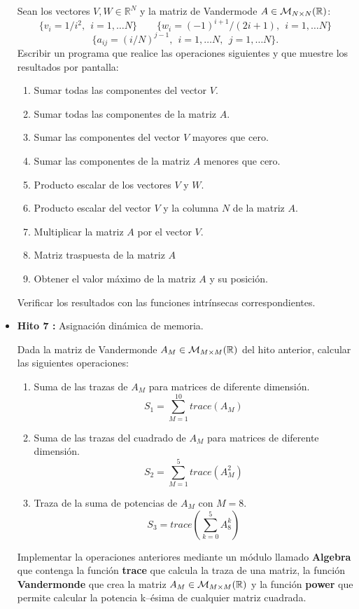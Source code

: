 \documentclass[12pt,spanish]{article}
\begin{document}
\begin{itemize}
Sean los vectores $V, W \in \mathbb{R}^N$ y la matriz de Vandermode $A \in 
{\cal M}_{N \times N} (\mathbb{R})$: 
$$
\{ v_i =  1/i^2, \ \  i=1, \ldots N \} \qquad  \{  w_i = (-1)^{i+1}/(2i+1), \ \   i=1, \ldots N  \} 
$$
$$
\{ a_{ij} = (i/N)^{j-1}, \ \ i=1, \ldots N, \ \  j=1, \ldots N \}. 
$$
Escribir un programa que realice las operaciones siguientes y que muestre los
resultados por pantalla: 
\begin{enumerate}
	\item Sumar todas las componentes del vector $V$. 
	\item Sumar todas las componentes de la matriz $A$.   
	\item Sumar las componentes del vector $V$ mayores que cero.
	\item Sumar las componentes de la matriz $A$ menores que cero.   
	\item Producto escalar de los vectores $V$ y $W$.   
	\item Producto escalar del vector $V$ y la columna $N$ de la matriz $A$. 
	\item Multiplicar la matriz $A$ por el vector $V$.
	\item Matriz traspuesta de la matriz $A$   
	\item Obtener el valor máximo de la matriz $A$ y su posición.
\end{enumerate}

Verificar los resultados con las funciones intrínsecas correspondientes. 


\item {\bf Hito 7 :}   Asignación dinámica de memoria.

Dada la matriz  de Vandermonde $A_M \in {\cal M}_{M \times M} (\mathbb{R})$ del hito anterior,
calcular las siguientes operaciones: 


\begin{enumerate}	
	\item Suma de las trazas de $ A_M $ para matrices de diferente dimensión. 
	$$  S_1 = \sum_{M=1} ^{10} trace(A_M) $$ 
	\item  Suma de las trazas del cuadrado de $ A_M $ para matrices de diferente dimensión. 
	$$  S_2 = \sum_{M=1} ^{5} trace(A_M^2) $$ 
	\item Traza de la suma de potencias de $ A_M $  con $ M=8 $.
	$$  S_3 = trace \left( \sum_{k=0} ^{5} A_8^k  \right) $$
\end{enumerate}  
 
Implementar la operaciones anteriores mediante un módulo llamado \textbf{Algebra} 
que contenga la función  \textbf{trace} que calcula la traza de una matriz, la 
función  \textbf{Vandermonde} que crea la matriz  $ A_M \in { \cal M } _{ M 
\times M } ( \mathbb{R} )$ 
 y la función \textbf{power} que permite calcular la potencia k--ésima de 
 cualquier matriz cuadrada. 


\end{itemize}
\end{document}
